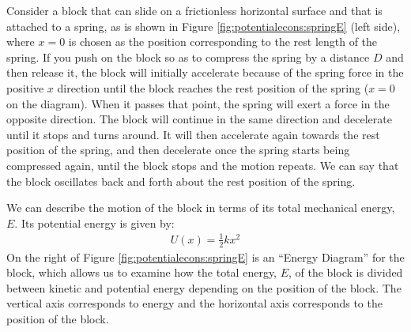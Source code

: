 Consider a block that can slide on a frictionless horizontal surface and that is attached to a spring, as is shown in Figure \ref{fig:potentialecons:springE} (left side), where $x=0$ is chosen as the position corresponding to the rest length of the spring. If you push on the block so as to compress the spring by a distance $D$ and then release it, the block will initially accelerate because of the spring force in the positive $x$ direction until the block reaches the rest position of the spring ($x=0$ on the diagram). When it passes that point, the spring will exert a force in the opposite direction. The block will continue in the same direction and decelerate until it stops and turns around. It will then accelerate again towards the rest position of the spring, and then decelerate once the spring starts being compressed again, until the block stops and the motion repeats. We can say that the block oscillates back and forth about the rest position of the spring.

We can describe the motion of the block in terms of its total mechanical energy, $E$. Its potential energy is given by:
\begin{align*}
U(x)=\frac{1}{2}kx^2
\end{align*}
On the right of Figure \ref{fig:potentialecons:springE} is an ``Energy Diagram'' for the block, which allows us to examine how the total energy, $E$, of the block is divided between kinetic and potential energy depending on the position of the block. The vertical axis corresponds to energy and the horizontal axis corresponds to the position of the block. 

